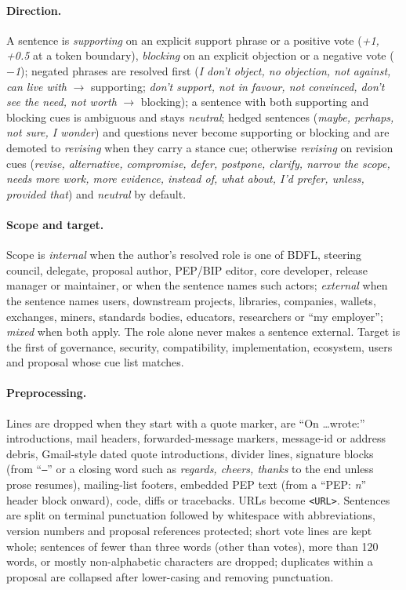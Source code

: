 \documentclass[sigconf,screen]{acmart}
\begin{document}
\paragraph{Direction.} A sentence is \emph{supporting} on an explicit support phrase or a positive vote (\emph{+1, +0.5} at a token boundary), \emph{blocking} on an explicit objection or a negative vote (\emph{$-$1}); negated phrases are resolved first (\emph{I don't object, no objection, not against, can live with} $\rightarrow$ supporting; \emph{don't support, not in favour, not convinced, don't see the need, not worth} $\rightarrow$ blocking); a sentence with both supporting and blocking cues is ambiguous and stays \emph{neutral}; hedged sentences (\emph{maybe, perhaps, not sure, I wonder}) and questions never become supporting or blocking and are demoted to \emph{revising} when they carry a stance cue; otherwise \emph{revising} on revision cues (\emph{revise, alternative, compromise, defer, postpone, clarify, narrow the scope, needs more work, more evidence, instead of, what about, I'd prefer, unless, provided that}) and \emph{neutral} by default.

\paragraph{Scope and target.} Scope is \emph{internal} when the author's resolved role is one of BDFL, steering council, delegate, proposal author, PEP/BIP editor, core developer, release manager or maintainer, or when the sentence names such actors; \emph{external} when the sentence names users, downstream projects, libraries, companies, wallets, exchanges, miners, standards bodies, educators, researchers or ``my employer''; \emph{mixed} when both apply. The role alone never makes a sentence external. Target is the first of governance, security, compatibility, implementation, ecosystem, users and proposal whose cue list matches.

\paragraph{Preprocessing.} Lines are dropped when they start with a quote marker, are ``On \ldots wrote:'' introductions, mail headers, forwarded-message markers, message-id or address debris, Gmail-style dated quote introductions, divider lines, signature blocks (from ``\texttt{--}'' or a closing word such as \emph{regards, cheers, thanks} to the end unless prose resumes), mailing-list footers, embedded PEP text (from a ``PEP: \emph{n}'' header block onward), code, diffs or tracebacks. URLs become \texttt{<URL>}. Sentences are split on terminal punctuation followed by whitespace with abbreviations, version numbers and proposal references protected; short vote lines are kept whole; sentences of fewer than three words (other than votes), more than 120 words, or mostly non-alphabetic characters are dropped; duplicates within a proposal are collapsed after lower-casing and removing punctuation.
\end{document}
